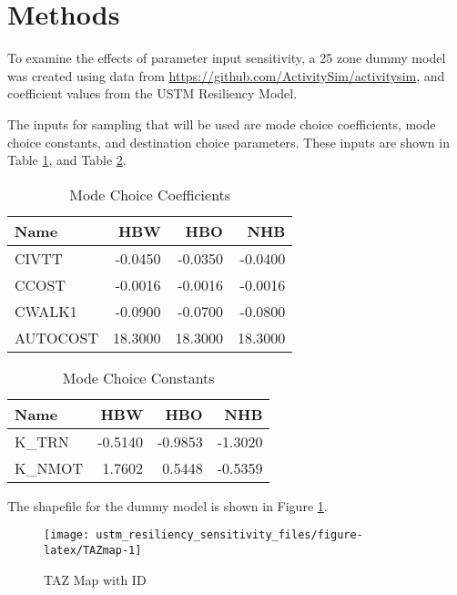 \documentclass[3p, authoryear, review]{elsarticle} %
\begin{document}
\hypertarget{methods}{%
\section{Methods}\label{methods}}

To examine the effects of parameter input sensitivity, a 25 zone dummy model was created using data from \url{https://github.com/ActivitySim/activitysim}, and coefficient values from the USTM Resiliency Model.

The inputs for sampling that will be used are mode choice coefficients, mode choice constants, and destination choice parameters. These inputs are shown in Table \ref{tab:MCcoeff}, and Table \ref{tab:MCconst}.

\begin{table}

\caption{\label{tab:MCcoeff}Mode Choice Coefficients}
\centering
\begin{tabular}[t]{l|r|r|r}
\hline
Name & HBW & HBO & NHB\\
\hline
CIVTT & -0.0450 & -0.0350 & -0.0400\\
\hline
CCOST & -0.0016 & -0.0016 & -0.0016\\
\hline
CWALK1 & -0.0900 & -0.0700 & -0.0800\\
\hline
AUTOCOST & 18.3000 & 18.3000 & 18.3000\\
\hline
\end{tabular}
\end{table}

\begin{table}

\caption{\label{tab:MCconst}Mode Choice Constants}
\centering
\begin{tabular}[t]{l|r|r|r}
\hline
Name & HBW & HBO & NHB\\
\hline
K\_TRN & -0.5140 & -0.9853 & -1.3020\\
\hline
K\_NMOT & 1.7602 & 0.5448 & -0.5359\\
\hline
\end{tabular}
\end{table}

The shapefile for the dummy model is shown in Figure \ref{fig:TAZmap}.

\begin{figure}

{\centering \texttt{[image: ustm\_resiliency\_sensitivity\_files/figure-latex/TAZmap-1]} 

}

\caption{TAZ Map with ID}\label{fig:TAZmap}
\end{figure}
\end{document}
